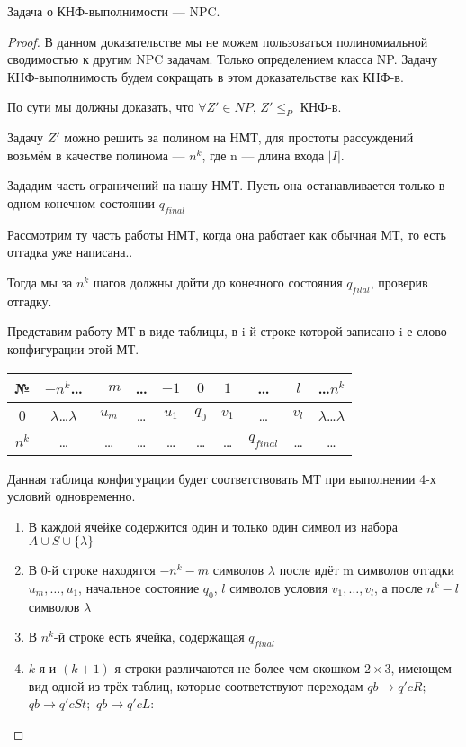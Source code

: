 \begin{theorem}
Задача о КНФ-выполнимости --- NPC.
\end{theorem}
\begin{proof}
В данном доказательстве мы не можем пользоваться полиномиальной сводимостью к
другим NPC задачам. Только определением класса NP. Задачу КНФ-выполнимость будем
сокращать в этом доказательстве как КНФ-в.

По сути мы должны доказать, что $\forall Z' \in NP$,  $Z' \le_P$ КНФ-в. 

Задачу $Z'$ можно решить за полином на НМТ, для простоты рассуждений возьмём в
качестве полинома --- $n^k$, где n --- длина входа  $|I|$. 

Зададим часть ограничений на нашу НМТ. Пусть она останавливается только в одном
конечном состоянии $q_{final}$

Рассмотрим ту часть работы НМТ, когда она работает как обычная МТ, то есть
отгадка уже написана..

Тогда мы за $n^k$ шагов должны дойти до конечного состояния $q_{filal}$,
проверив отгадку.

Представим работу МТ в виде таблицы, в i-й строке которой записано i-е слово
конфигурации этой МТ.
\begin{table}[htpb]
	\centering
	\begin{tabular}{|c|c| c|c|c |c|c|c| c|c|}
\hline №&$-n^k$\ldots& $-m$& \ldots&$-1$&$0$& $1$ &\ldots&$l$&
		\ldots$n^k$\\
		\hline
		      0&$\lambda$\ldots$\lambda$&$u_m$&\ldots&$u_1$&$q_0$&$v_1$&\ldots&$v_l$
			       &$\lambda$\ldots$\lambda$\\\hline
\hline
$n^k$&\ldots&\ldots&\ldots&\ldots&\ldots&\ldots&$q_{final}$&\ldots&\ldots\\\hline
	\end{tabular}
\end{table}

Данная таблица конфигурации будет соответствовать МТ при выполнении 4-х условий
одновременно.
\begin{enumerate}
	\item В каждой ячейке содержится один и только один символ из набора $A
		\cup S \cup \{\lambda\}$
	\item В 0-й строке находятся $-n^k - m$ символов  $\lambda$ после идёт m
		символов отгадки $u_m, \ldots, u_1$, начальное состояние $q_0$,  $l$ символов
		условия $v_1, \ldots, v_l$, а после  $n^k-l$ символов  $\lambda$
	\item В $n^k$-й строке есть ячейка, содержащая $q_{final}$
	\item $k$-я и $(k+1)$-я строки различаются не более чем окошком $2\times
		3$, имеющем вид одной из трёх таблиц, которые соответствуют переходам $qb \to q'cR;$ $qb\to q'cSt;$ $qb\to q'cL $:		


\end{enumerate}
\end{proof}
